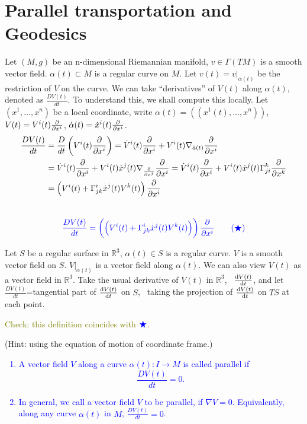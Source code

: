 \section{Parallel transportation and Geodesics}
Let \((M,g)\) be an n-dimensional Riemannian manifold, \(v\in 
\Gamma(TM)\) is a smooth vector field. \(\alpha(t)\subset M\) is a 
regular curve on \(M\). Let \(v(t)=v|_{\alpha(t)}\) be the restriction of 
\(V\) on the curve. We can take ``derivatives'' of \(V(t)\) along 
\(\alpha(t)\), denoted as \(\frac{D V(t)}{dt}\). To understand this,
we shall compute this locally. Let \((x^1,\ldots, x^n)\) be a local
coordinate, write \(\alpha(t)=\left((x^1(t),\ldots,x^n)\right)\), 
\(V(t)=V^i(t)\pdv{x^i}\), \(\dot{\alpha}(t)=\dot{x}^i(t)\pdv{x^i}\).
\begin{align*}
    \frac{DV(t)}{dt}&=\frac{D}{dt}\left(V^i(t)\pdv{x^i}\right)
    =\dot{V}^i(t)\pdv{x^i}+V^i(t)\nabla_{\dot{a}(t)}\pdv{x^i}\\
    &=\dot{V}^i(t)\pdv{x^i}+V^i(t)\dot{x}^j(t)\nabla_{\pdv{x^j}}\pdv{x^i}
    =\dot{V}^i(t)\pdv{x^i}+
    V^i(t)\dot{x}^j(t)\Gamma\indices*{_{ji}^k}\pdv{x^k}\\
    &=\left(V^i(t)+
    \Gamma\indices*{_{jk}^i}\dot{x}^j(t)V^k(t)\right)\pdv{x^i}
\end{align*}
\ie\ 
\[
    \textcolor{blue}{
        \frac{DV(t)}{dt}=\left(\left(V^i(t)+
        \Gamma\indices*{_{jk}^i}\dot{x}^j(t)V^k(t)\right)\right)
        \pdv{x^i}
        \tag{\(\textcolor{blue}{\bigstar}\)}
    }
\]
\begin{remark}
    Let \(S\) be a regular surface in \(\mathbb{R}^3\),
    \(\alpha(t)\in S\) is a regular curve. \(V\) is a smooth vector
    field on \(S\). \(V|_{\alpha(t)}\) is a vector field along
    \(\alpha(t)\). We can also view \(V(t)\) as a vector field in 
    \(\mathbb{R}^3\). Take the usual derivative of \(V(t)\) in 
    \(\mathbb{R}^3\), \ie\ \(\dv{V(t)}{t}\), and let
    \(\frac{DV(t)}{dt}\)=tangential part of \(\dv{V(t)}{t}\) on \(S\),
    \ie\ taking the projection of \(\dv{V(t)}{t}\) on \(TS\) at each point.
\end{remark}
\textcolor{olive}{
    \begin{exercise}
        Check: this definition coincides with 
        \(\textcolor{blue}{\bigstar}\).
    \end{exercise}
}
(Hint: using the equation of motion of coordinate frame.)
\textcolor{blue}{
    \begin{definition}
        \begin{enumerate}[(1)]
            \item A vector field \(V\) along a curve \(\alpha(t)\colon
            I\to M\) is called parallel if 
            \[
                \frac{DV(t)}{dt}=0   . 
            \]
            \item In general, we call a vector field \(V\) to be parallel, 
            if \(\nabla V=0\). Equivalently, along any curve \(\alpha(t)\)
            in \(M\), \(\frac{DV(t)}{dt}=0\).
        \end{enumerate}
    \end{definition}
}
